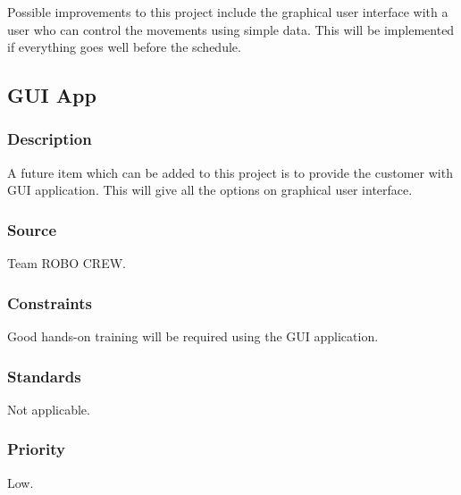 Possible improvements to this project include the graphical user interface with a user who can control the movements using simple data. This will be implemented if everything goes well before the schedule.  
\subsection{GUI App}
\subsubsection{Description}
A future item which can be added to this project is to provide the customer with GUI application. This will give all the options on graphical user interface. 
\subsubsection{Source}
Team ROBO CREW.
\subsubsection{Constraints}
Good hands-on training will be required using the GUI application. 
\subsubsection{Standards}
Not applicable.  
\subsubsection{Priority}
Low.